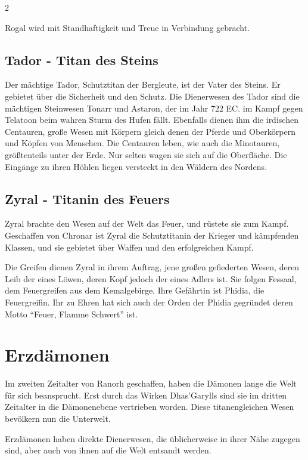 \begin{multicols}{2}
{Rogal wird mit Standhaftigkeit und Treue in Verbindung gebracht.

\subsection{Tador - Titan des Steins}\label{subsec:tador-titan-des-steins}

Der mächtige Tador, Schutztitan der Bergleute, ist der Vater des Steins.
Er gebietet über die Sicherheit und den Schutz.
Die Dienerwesen des Tador sind die mächtigen Steinwesen Tonarr und Astaron, der im Jahr 722 EC. im Kampf gegen Telatoon beim wahren Sturm des Hufen fällt.
Ebenfalls dienen ihm die irdischen Centauren, große Wesen mit Körpern gleich denen der Pferde und Oberkörpern und Köpfen von Menschen.
Die Centauren leben, wie auch die Minotauren, größtenteils unter der Erde.
Nur selten wagen sie sich auf die Oberfläche.
Die Eingänge zu ihren Höhlen liegen versteckt in den Wäldern des Nordens.

\subsection{Zyral - Titanin des Feuers}\label{subsec:zyral-titanin-des-feuers}

Zyral brachte den Wesen auf der Welt das Feuer, und rüstete sie zum Kampf.
Geschaffen von Chronar ist Zyral die Schutztitanin der Krieger und kämpfenden Klassen, und sie gebietet über Waffen und den erfolgreichen Kampf.

Die Greifen dienen Zyral in ihrem Auftrag, jene großen gefiederten Wesen, deren Leib der eines Löwen, deren Kopf jedoch der eines Adlers ist.
Sie folgen Fessaal, dem Feuergreifen aus dem Kemalgebirge.
Ihre Gefährtin ist Phidia, die Feuergreifin.
Ihr zu Ehren hat sich auch der Orden der Phidia gegründet deren Motto ``Feuer, Flamme Schwert'' ist.

\section{Erzdämonen}\label{sec:erzdamonen2}

Im zweiten Zeitalter von Ranorh geschaffen, haben die Dämonen lange die Welt für sich beansprucht.
Erst durch das Wirken Dhas'Garylls sind sie im dritten Zeitalter in die Dämonenebene vertrieben worden.
Diese titanengleichen Wesen bevölkern nun die Unterwelt.

Erzdämonen haben direkte Dienerwesen, die üblicherweise in ihrer Nähe zugegen sind, aber auch von ihnen auf die Welt entsandt werden.

}
\end{multicols}
